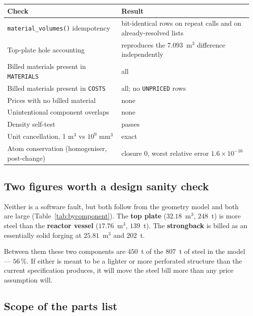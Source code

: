 \documentclass[9pt,a4paper]{extarticle}
\newcommand{\code}[1]{\texttt{\small #1}}
\begin{document}
\begin{center}\footnotesize
\begin{tabular}{@{}lp{6.6cm}@{}}
\toprule
\textbf{Check} & \textbf{Result} \\
\midrule
\code{material\_volumes()} idempotency & bit-identical rows on repeat calls and on already-resolved lists \\
Top-plate hole accounting              & reproduces the $7.093$~m$^3$ difference independently \\
Billed materials present in \code{MATERIALS} & all \\
Billed materials present in \code{COSTS}     & all; no \code{UNPRICED} rows \\
Prices with no billed material               & none \\
Unintentional component overlaps             & none \\
Density self-test                            & passes \\
Unit cancellation, 1 m$^3$ vs $10^9$ mm$^3$  & exact \\
Atom conservation (homogeniser, post-change) & closure $0$, worst relative error $1.6\times10^{-16}$ \\
\bottomrule
\end{tabular}
\end{center}

\subsection{Two figures worth a design sanity check}
\label{sec:aud:heavy}

Neither is a software fault, but both follow from the geometry model and both
are large (Table~\ref{tab:bycomponent}). The \textbf{top plate} ($32.18$~m$^3$,
$248$~t) is more steel than the
\textbf{reactor vessel} ($17.76$~m$^3$, $139$~t). The \textbf{strongback} is
billed as an essentially solid forging at $25.81$~m$^3$ and $202$~t.

Between them these two components are $450$~t of the $807$~t of steel in the
model --- $56\,\%$. If either is meant to be a lighter or more perforated
structure than the current specification produces, it will move the steel bill
more than any price assumption will.

\subsection{Scope of the parts list}
\label{sec:aud:scope}
\end{document}
